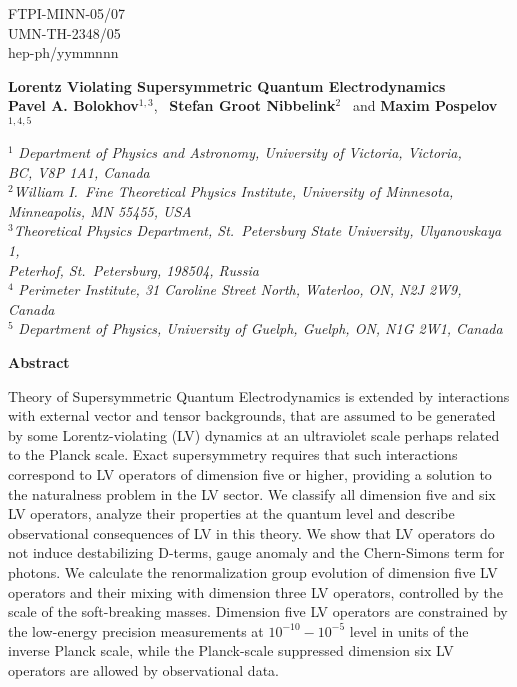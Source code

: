\documentclass[12pt]{revtex4}
\begin{document}
\begin{titlepage}
\renewcommand{\thefootnote}{\fnsymbol{footnote}}

\begin{flushright}
FTPI-MINN-05/07\\
UMN-TH-2348/05\\
hep-ph/yymmnnn
\end{flushright}
\vskip -1cm
\begin{center}
\vspace{0.5cm}

\large {\bf Lorentz Violating Supersymmetric Quantum Electrodynamics}\\[3mm] 
  
\vspace*{0.5cm}
\normalsize
{\bf Pavel A. Bolokhov}$^{1,3}$, ~{\bf Stefan Groot Nibbelink}$^{2}$
\ and
{\bf Maxim Pospelov}$^{1,4,5}$%

\vspace*{0.5cm}
$^{1}$ {\it Department of Physics and Astronomy,
University of Victoria, Victoria,\\ BC, V8P 1A1, Canada}\\
$^{2}${\it William I.\ Fine Theoretical Physics Institute,
University of Minnesota,\\ Minneapolis, MN 55455, USA}\\
$^{3}${\it Theoretical Physics Department, 
St.\ Petersburg State University, Ulyanovskaya 1,\\
Peterhof, St.\ Petersburg, 198504, Russia}\\
$^{4}$ {\it Perimeter Institute, 31 Caroline Street North,
Waterloo, ON,  N2J 2W9,
Canada}\\
$^{5}$ {\it Department of Physics,
 University of Guelph,
 Guelph, ON,  N1G 2W1, Canada}
 \end{center}

\centerline{\large\bf Abstract}

Theory of Supersymmetric Quantum Electrodynamics is extended by 
interactions with external vector and tensor backgrounds, that are 
assumed to be generated by some Lorentz-violating (LV) dynamics at an 
ultraviolet scale perhaps related to the Planck scale. Exact supersymmetry
requires that such interactions correspond to LV operators of
dimension five or higher, providing a solution to the naturalness
problem in the LV sector. We classify all dimension five and six LV
operators, analyze their properties at the quantum level and describe
observational consequences of LV in this theory. 
We show that LV operators do not induce destabilizing D-terms,
gauge anomaly and the Chern-Simons term for photons. We calculate 
the renormalization group evolution of dimension five LV operators and
their mixing with dimension three LV operators, controlled by the
scale of the soft-breaking masses. Dimension five LV operators are
constrained by the low-energy precision measurements at 
$10^{-10}-10^{-5}$ level in units of the inverse Planck scale, while
the Planck-scale suppressed dimension six LV operators are allowed by
observational data.   





\end{titlepage}
\end{document}
